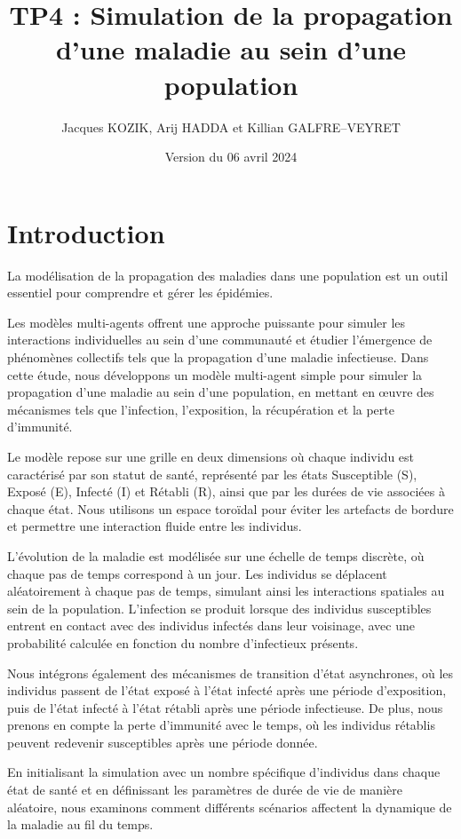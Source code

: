 \documentclass[french]{article}
\title{\vfill TP4 : Simulation de la propagation d'une maladie au sein d'une population}
\author{Jacques KOZIK, Arij HADDA et Killian GALFRE--VEYRET}
\date{Version du 06 avril 2024\vfill}
\begin{document}
\maketitle
\newpage

\tableofcontents
\newpage

\section{Introduction}

La modélisation de la propagation des maladies dans une population est un outil essentiel pour comprendre et gérer les épidémies. 

Les modèles multi-agents offrent une approche puissante pour simuler les interactions individuelles au sein d'une communauté et étudier l'émergence de phénomènes collectifs tels que la propagation d'une maladie infectieuse. Dans cette étude, nous développons un modèle multi-agent simple pour simuler la propagation d'une maladie au sein d'une population, en mettant en œuvre des mécanismes tels que l'infection, l'exposition, la récupération et la perte d'immunité.

Le modèle repose sur une grille en deux dimensions où chaque individu est caractérisé par son statut de santé, représenté par les états Susceptible (S), Exposé (E), Infecté (I) et Rétabli (R), ainsi que par les durées de vie associées à chaque état. Nous utilisons un espace toroïdal pour éviter les artefacts de bordure et permettre une interaction fluide entre les individus.

L'évolution de la maladie est modélisée sur une échelle de temps discrète, où chaque pas de temps correspond à un jour. Les individus se déplacent aléatoirement à chaque pas de temps, simulant ainsi les interactions spatiales au sein de la population. L'infection se produit lorsque des individus susceptibles entrent en contact avec des individus infectés dans leur voisinage, avec une probabilité calculée en fonction du nombre d'infectieux présents.

Nous intégrons également des mécanismes de transition d'état asynchrones, où les individus passent de l'état exposé à l'état infecté après une période d'exposition, puis de l'état infecté à l'état rétabli après une période infectieuse. De plus, nous prenons en compte la perte d'immunité avec le temps, où les individus rétablis peuvent redevenir susceptibles après une période donnée.

En initialisant la simulation avec un nombre spécifique d'individus dans chaque état de santé et en définissant les paramètres de durée de vie de manière aléatoire, nous examinons comment différents scénarios affectent la dynamique de la maladie au fil du temps.
\end{document}
